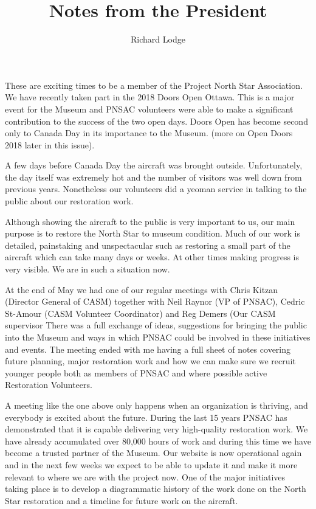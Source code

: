 
%


\title{Notes from the President}
\author{Richard Lodge}

\maketitle

These are exciting times to be a member of the Project North Star Association.
We  have recently taken part in the 2018 Doors Open Ottawa. This is a major
event for the Museum and PNSAC volunteers were able to make a significant
contribution to the success of the two open days. Doors Open has become second
only to Canada Day in its importance to the Museum. (more on Open Doors 2018
later in this issue).

A few days before Canada Day the aircraft was brought outside. Unfortunately,
the day itself was extremely hot and the number of visitors was well down from
previous years. Nonetheless our volunteers did a yeoman service in talking to
the public about our restoration work.

Although showing the aircraft to the public is very important to us, our main
purpose is to restore the North Star to museum condition. Much of our work is
detailed, painstaking and unspectacular such as restoring a small part of the
aircraft which can take many days or weeks. At other times making progress is
very visible. We are in such a situation now.

At the end of May we had one of our regular meetings with Chris Kitzan (Director
General of CASM) together with Neil Raynor (VP of PNSAC), Cedric St-Amour (CASM
Volunteer Coordinator) and Reg Demers (Our CASM supervisor There was a full
exchange of ideas, suggestions for bringing  the public into the Museum and ways
in which PNSAC could be involved in these initiatives and events. The meeting
ended with me having a full sheet of notes covering future planning, major
restoration work and how we can make sure we recruit younger people both as
members of PNSAC and where possible active Restoration Volunteers. 

A meeting like the one above only happens when an organization is thriving, and
everybody is excited about the future. During the last 15 years PNSAC has
demonstrated that it is capable delivering very high-quality restoration work.
We have already accumulated over 80,000 hours of work and during this time we
have become a trusted partner of the Museum. Our website is now operational
again and in the next few weeks we expect to be able to update it and make it
more relevant to where we are with the project now. One of the major initiatives
taking place is to develop a diagrammatic history of the work done on the North
Star restoration and a timeline for future work on the aircraft. 

